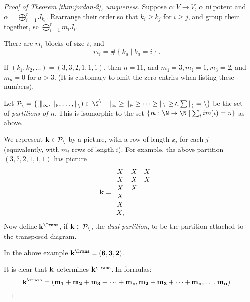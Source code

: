 \begin{proof}
	[Proof of Theorem \ref{thm:jordan-2}, uniqueness] Suppose $\alpha:V\to V$, $\alpha$ nilpotent and $\alpha=\bigoplus_{i=1}^r J_{k_i}$. Rearrange their order so that $k_i\geq k_j$ for $i\geq j$, and group them together, so $\bigoplus_{i=1}^r m_i J_i$. %
	
	There are $m_i$ blocks of size $i$, and %
	\begin{equation*}
		m_i = \#\left\{k_a \mid k_a = i\right\}. \tag{$*$}
	\end{equation*}
	\vspace{-9pt}
	\begin{example}
		If $(k_1,k_2,\dots) = (3,3,2,1,1,1)$, then $n=11$, and $m_1 = 3, m_2 =1, m_3 =2$, and $ m_a = 0 $ for $a > 3$. (It is customary to omit the zero entries when listing these numbers). %
	\end{example}

	\begin{definition}
		Let $\cal{P}_n = \{ (k_1,k_2, \dots, k_n) \in \N^n \mid k_1 \geq k_2 \geq \dots \geq k_n \geq 0, \sum k_i = n\}$ be the set of \emph{partitions of $n$}. This is isomorphic to the set $\{ m : \N \to \N \mid \sum_i im(i) = n \}$ as above. %
	\end{definition}

	We represent $\bf{k}\in\cal{P}_n$ by a picture, with a row of length $k_j$ for each $j$ (equivalently, with $m_i$ rows of length $i$). For example, the above partition $(3,3,2,1,1,1)$ has picture %
	\begin{equation*}
		\bf{k} =
		\begin{array}{ccc}
			X & X & X \\
			X & X & X \\ %
			X & X \\
			X \\
			X \\
			X,
		\end{array}
	\end{equation*}
	Now define $\bf{k}^\Trans$, if $\bf{k}\in\cal{P}_n$, the \emph{dual partition}, to be the partition attached to the transposed diagram. %

	In the above example $\bf{k}^\Trans = (6,3,2)$. 
	
	It is clear that $\bf{k}$ determines $\bf{k}^\Trans$. In formulas: %
	\begin{equation*}
		\bf{k}^\Trans = (m_1+m_2+m_3+\dots+m_n, m_2 + m_3 + \dots + m_n, \dots, m_n)
	\end{equation*}


\end{proof}
